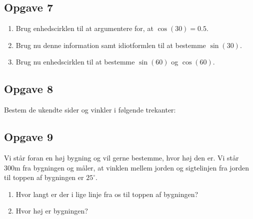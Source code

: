 \subsection*{Opgave 7}
\begin{enumerate}[label=\roman*)]
\item Brug enhedscirklen til at argumentere for, at $\cos(30) = 0.5$.
\item Brug nu denne information samt idiotformlen til at bestemme $\sin(30)$.
\item Brug nu enhedscirklen til at bestemme $\sin(60)$ og $\cos(60)$. 

\end{enumerate}


\subsection*{Opgave 8}
Bestem de ukendte sider og vinkler i følgende trekanter:





\subsection*{Opgave 9}
Vi står foran en høj bygning og vil gerne bestemme, hvor høj den er. Vi står 300m fra bygningen og måler, at vinklen mellem jorden og sigtelinjen fra jorden til toppen af bygningen er $25^\circ$.
\begin{enumerate}[label=\roman*)]
\item Hvor langt er der i lige linje fra os til toppen af bygningen?
\item Hvor høj er bygningen?
\end{enumerate}

